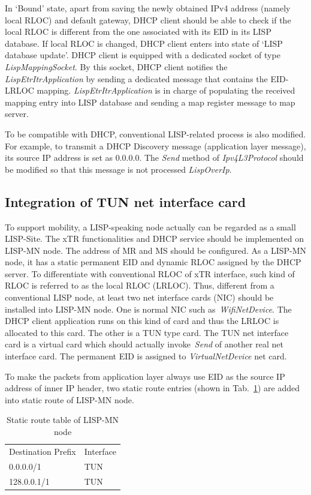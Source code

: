 In `Bound' state, apart from saving the newly obtained IPv4 address (namely local RLOC) and default gateway, DHCP client should be able to check if the local RLOC is different from the one associated with its EID in its LISP database.
If local RLOC is changed, DHCP client enters into state of `LISP database update'. DHCP client is equipped with a dedicated socket of type \emph{LispMappingSocket}. By this socket, DHCP client notifies the \emph{LispEtrItrApplication} by sending a dedicated message that contains the EID-LRLOC mapping. \emph{LispEtrItrApplication} is in charge of populating the received mapping entry into LISP database and sending a map register message to map server.

To be compatible with DHCP, conventional LISP-related process is also modified. For example, to transmit a DHCP Discovery message (application layer message), its source IP address is set as $0.0.0.0$. The \emph{Send} method of \emph{Ipv4L3Protocol} should be modified so that this message is not processed \emph{LispOverIp}.

\subsection{Integration of TUN net interface card}
\label{subsec:tundevice}
To support mobility, a LISP-speaking node actually can be regarded as a small LISP-Site. The xTR functionalities and DHCP service should be implemented on LISP-MN node. The address of MR and MS should be configured. As a LISP-MN node, it has a static permanent EID and dynamic RLOC assigned by the DHCP server. To differentiate with conventional RLOC of xTR interface, such kind of RLOC is referred to as the local RLOC (LRLOC). Thus, different from a conventional LISP node, at least two net interface cards (NIC) should be installed into LISP-MN node. One is normal NIC such as~\emph{WifiNetDevice}. The DHCP client application runs on this kind of card and thus the LRLOC is allocated to this card. The other is a TUN type card. The TUN net interface card is a virtual card which should actually invoke~\emph{Send} of another real net interface card. The permanent EID is assigned to \emph{VirtualNetDevice} net card. 

To make the packets from application layer always use EID as the source IP address of inner IP header, two static route entries (shown in Tab.~\ref{tab:static-route-table}) are added into static route of LISP-MN node.
\begin{table}[]
	\centering
	\caption{Static route table of LISP-MN node}
	\label{tab:static-route-table}
	\begin{tabular}{ll}
		Destination Prefix & Interface \\
		0.0.0.0/1          & TUN       \\
		128.0.0.1/1        & TUN      
	\end{tabular}
\end{table}

